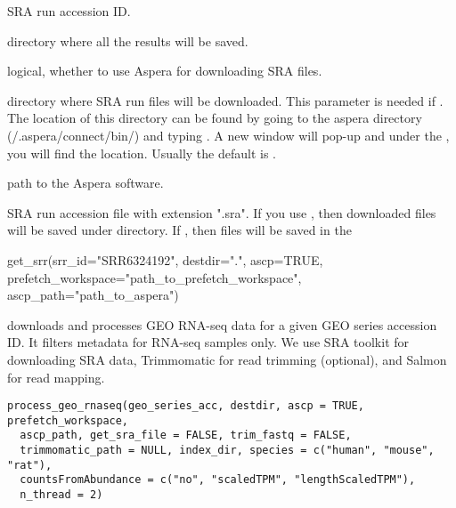 \documentclass[letterpaper]{book}
\begin{document}
%
\begin{Arguments}
\begin{ldescription}
\item[\code{srr\_id}] SRA run accession ID.

\item[\code{destdir}] directory where all the results will be saved.

\item[\code{ascp}] logical, whether to use Aspera for downloading SRA files.

\item[\code{prefetch\_workspace}] directory where SRA run files will be downloaded. This parameter is needed if . 
The location of this directory can be found by going to the aspera directory (/.aspera/connect/bin/) and typing .
A new window will pop-up and under the , you will find the location. Usually the default is .

\item[\code{ascp\_path}] path to the Aspera software.
\end{ldescription}
\end{Arguments}
%
\begin{Value}
SRA run accession file with extension ".sra". If you use , then downloaded files will be saved under  directory. 
If , then files will be saved in the 
\end{Value}
%
\begin{Examples}
\begin{ExampleCode}
get_srr(srr_id="SRR6324192", destdir=".", ascp=TRUE, 
prefetch_workspace="path_to_prefetch_workspace", ascp_path="path_to_aspera")

\end{ExampleCode}
\end{Examples}
%
\begin{Description}\relax
{} downloads and processes GEO RNA-seq data for a given GEO series accession ID. It filters metadata for RNA-seq samples only. 
We use SRA toolkit for downloading SRA data, Trimmomatic for read trimming (optional), and Salmon for read mapping.
\end{Description}
%
\begin{Usage}
\begin{verbatim}
process_geo_rnaseq(geo_series_acc, destdir, ascp = TRUE, prefetch_workspace,
  ascp_path, get_sra_file = FALSE, trim_fastq = FALSE,
  trimmomatic_path = NULL, index_dir, species = c("human", "mouse", "rat"),
  countsFromAbundance = c("no", "scaledTPM", "lengthScaledTPM"),
  n_thread = 2)
\end{verbatim}
\end{Usage}
\end{document}
